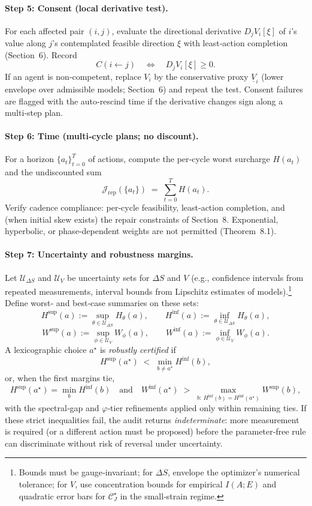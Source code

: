 \documentclass[11pt]{article}
\begin{document}
\paragraph{Step 5: Consent (local derivative test).}
For each affected pair $(i,j)$, evaluate the directional derivative $D_j V_i[\xi]$ of $i$’s value along $j$’s contemplated feasible direction $\xi$ with least‑action completion (Section~6). Record
\[
C(i\!\leftarrow\! j)\quad \Longleftrightarrow\quad D_j V_i[\xi]\ge 0.
\]
If an agent is non‑competent, replace $V_i$ by the conservative proxy $\underline V_i$ (lower envelope over admissible models; Section~6) and repeat the test. Consent failures are flagged with the auto‑rescind time if the derivative changes sign along a multi‑step plan.

\paragraph{Step 6: Time (multi‑cycle plans; no discount).}
For a horizon $\{a_t\}_{t=0}^T$ of actions, compute the per‑cycle worst surcharge $H(a_t)$ and the undiscounted sum
\[
\mathcal{J}_{\mathrm{rep}}(\{a_t\})\;=\;\sum_{t=0}^{T} H(a_t).
\]
Verify cadence compliance: per‑cycle feasibility, least‑action completion, and (when initial skew exists) the repair constraints of Section~8. Exponential, hyperbolic, or phase‑dependent weights are not permitted (Theorem~8.1).

\paragraph{Step 7: Uncertainty and robustness margins.}
Let $\mathcal{U}_{\Delta S}$ and $\mathcal{U}_V$ be uncertainty sets for $\Delta S$ and $V$ (e.g., confidence intervals from repeated measurements, interval bounds from Lipschitz estimates of models).\footnote{Bounds must be gauge‑invariant; for $\Delta S$, envelope the optimizer’s numerical tolerance; for $V$, use concentration bounds for empirical $I(A;E)$ and quadratic error bars for $\mathcal{C}_J^\star$ in the small‑strain regime.} Define worst‑ and best‑case summaries on these sets:
\[
H^{\sup}(a):=\sup_{\theta\in\mathcal{U}_{\Delta S}} H_\theta(a),\qquad
H^{\inf}(a):=\inf_{\theta\in\mathcal{U}_{\Delta S}} H_\theta(a),
\]
\[
W^{\sup}(a):=\sup_{\phi\in\mathcal{U}_V} W_\phi(a),\qquad
W^{\inf}(a):=\inf_{\phi\in\mathcal{U}_V} W_\phi(a).
\]
A lexicographic choice $a^\star$ is \emph{robustly certified} if
\[
H^{\sup}(a^\star) \;<\; \min_{b\neq a^\star} H^{\inf}(b),
\]
or, when the first margins tie,
\[
H^{\sup}(a^\star)=\min_{b} H^{\inf}(b)\quad\text{and}\quad
W^{\inf}(a^\star) \;>\; \max_{b:\ H^{\inf}(b)=H^{\inf}(a^\star)} W^{\sup}(b),
\]
with the spectral‑gap and $\varphi$‑tier refinements applied only within remaining ties. If these strict inequalities fail, the audit returns \emph{indeterminate}: more measurement is required (or a different action must be proposed) before the parameter‑free rule can discriminate without risk of reversal under uncertainty.
\end{document}
